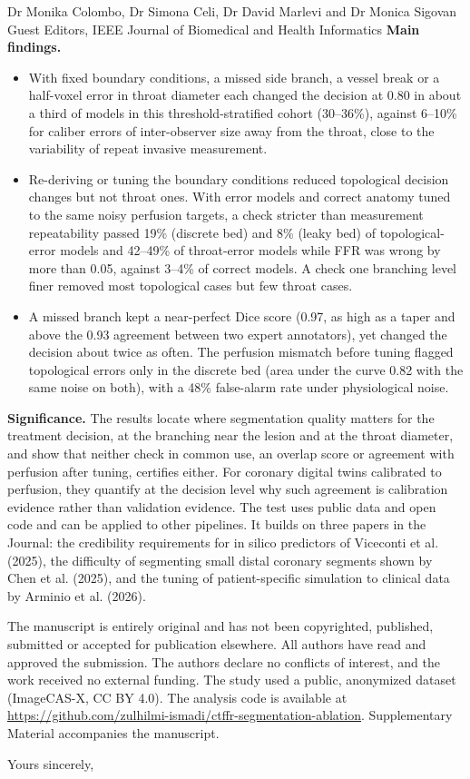 \documentclass[10pt]{letter}
\begin{document}
\begin{letter}{Dr Monika Colombo, Dr Simona Celi, Dr David Marlevi and Dr Monica Sigovan\\Guest Editors, IEEE Journal of Biomedical and Health Informatics}
\textbf{Main findings.}
\begin{itemize}
\item With fixed boundary conditions, a missed side branch, a vessel break or a half-voxel error in throat diameter
each changed the decision at 0.80 in about a third of models in this threshold-stratified cohort (30--36\%), against
6--10\% for caliber errors of inter-observer size away from the throat, close to the variability of repeat invasive
measurement.
\item Re-deriving or tuning the boundary conditions reduced topological decision changes but not throat ones. With
error models and correct anatomy tuned to the same noisy perfusion targets, a check stricter than measurement
repeatability passed 19\% (discrete bed) and 8\% (leaky bed) of topological-error models and 42--49\% of throat-error
models while FFR was wrong by more than 0.05, against 3--4\% of correct models. A check one branching level finer
removed most topological cases but few throat cases.
\item A missed branch kept a near-perfect Dice score (0.97, as high as a taper and above the 0.93 agreement between two
expert annotators), yet changed the decision about twice as often. The perfusion mismatch before tuning flagged topological errors only in the discrete bed (area under the curve 0.82 with the same noise on both), with a 48\% false-alarm rate under physiological noise.
\end{itemize}

\textbf{Significance.} The results locate where segmentation quality matters for the treatment decision, at the
branching near the lesion and at the throat diameter, and show that neither check in common use, an overlap score or
agreement with perfusion after tuning, certifies either. For coronary digital twins calibrated to perfusion, they
quantify at the decision level why such agreement is calibration evidence rather than validation evidence. The test uses public data and open code and can be applied to other pipelines. It builds on three papers in the Journal: the credibility requirements for in silico predictors of
Viceconti et al. (2025), the difficulty of segmenting small distal coronary segments shown by Chen et al. (2025), and
the tuning of patient-specific simulation to clinical data by Arminio et al. (2026).

The manuscript is entirely original and has not been copyrighted, published, submitted or accepted for publication
elsewhere. All authors have read
and approved the submission. The authors declare no conflicts of interest, and the work received no external funding.
The study used a public, anonymized dataset (ImageCAS-X, CC BY 4.0). The analysis code is available at \url{https://github.com/zulhilmi-ismadi/ctffr-segmentation-ablation}. Supplementary Material accompanies the manuscript.

\closing{Yours sincerely,}
\end{letter}
\end{document}
